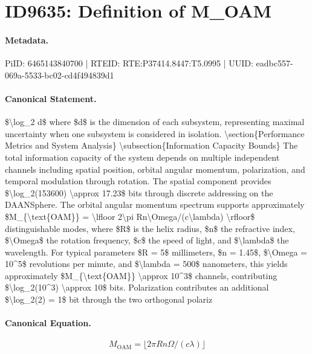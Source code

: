 \section*{ID9635: Definition of M\_OAM}
\paragraph{Metadata.}
PiID: 6465143840700 | RTEID: RTE:P37414.8447:T5.0995 | UUID: eadbc557-069a-5533-bc02-cd4f494839d1

\paragraph{Canonical Statement.}
\$\textbackslash{}log\_2 d\$ where \$d\$ is the dimension of each subsystem, representing maximal uncertainty when one subsystem is considered in isolation. \textbackslash{}section\{Performance Metrics and System Analysis\} \textbackslash{}subsection\{Information Capacity Bounds\} The total information capacity of the system depends on multiple independent channels including spatial position, orbital angular momentum, polarization, and temporal modulation through rotation. The spatial component provides \$\textbackslash{}log\_2(153600) \textbackslash{}approx 17.23\$ bits through discrete addressing on the DAANSphere. The orbital angular momentum spectrum supports approximately \$M\_\{\textbackslash{}text\{OAM\}\} = \textbackslash{}lfloor 2\textbackslash{}pi Rn\textbackslash{}Omega/(c\textbackslash{}lambda) \textbackslash{}rfloor\$ distinguishable modes, where \$R\$ is the helix radius, \$n\$ the refractive index, \$\textbackslash{}Omega\$ the rotation frequency, \$c\$ the speed of light, and \$\textbackslash{}lambda\$ the wavelength. For typical parameters \$R = 5\$ millimeters, \$n = 1.45\$, \$\textbackslash{}Omega = 10\textasciicircum{}5\$ revolutions per minute, and \$\textbackslash{}lambda = 500\$ nanometers, this yields approximately \$M\_\{\textbackslash{}text\{OAM\}\} \textbackslash{}approx 10\textasciicircum{}3\$ channels, contributing \$\textbackslash{}log\_2(10\textasciicircum{}3) \textbackslash{}approx 10\$ bits. Polarization contributes an additional \$\textbackslash{}log\_2(2) = 1\$ bit through the two orthogonal polariz

\paragraph{Canonical Equation.}
\[
M_{\text{OAM}} = \lfloor 2\pi Rn\Omega/(c\lambda) \rfloor
\]

